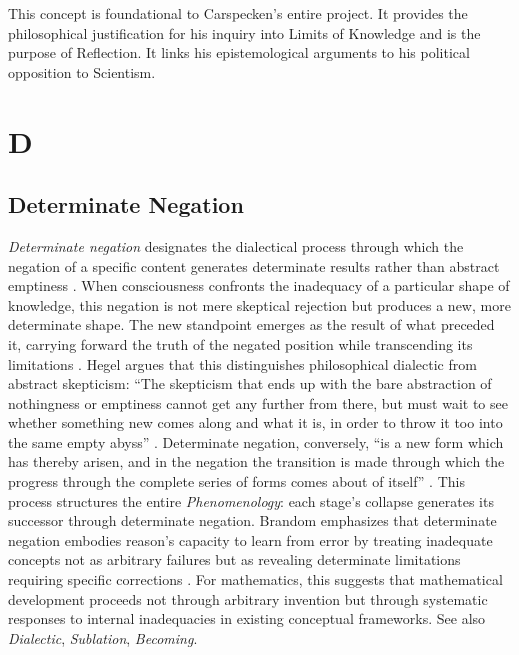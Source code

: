 \documentclass{book}
\begin{document}
This concept is foundational to Carspecken's entire project. It provides the philosophical justification for his inquiry into Limits of Knowledge and is the purpose of Reflection. It links his epistemological arguments to his political opposition to Scientism.

\parencite{carspecken_limits_2016}

\chapter{D}

\section{Determinate Negation}

\textit{Determinate negation} designates the dialectical process through which the negation of a specific content generates determinate results rather than abstract emptiness \parencite{hegel1977phenomenology}. When consciousness confronts the inadequacy of a particular shape of knowledge, this negation is not mere skeptical rejection but produces a new, more determinate shape. The new standpoint emerges as the result of what preceded it, carrying forward the truth of the negated position while transcending its limitations \parencite{hegel1977phenomenology}. Hegel argues that this distinguishes philosophical dialectic from abstract skepticism: ``The skepticism that ends up with the bare abstraction of nothingness or emptiness cannot get any further from there, but must wait to see whether something new comes along and what it is, in order to throw it too into the same empty abyss'' \parencite[\S 79]{hegel1977phenomenology}. Determinate negation, conversely, ``is a new form which has thereby arisen, and in the negation the transition is made through which the progress through the complete series of forms comes about of itself'' \parencite[\S 79]{hegel1977phenomenology}. This process structures the entire \textit{Phenomenology}: each stage's collapse generates its successor through determinate negation. Brandom emphasizes that determinate negation embodies reason's capacity to learn from error by treating inadequate concepts not as arbitrary failures but as revealing determinate limitations requiring specific corrections \parencite{Brandom:2019aa}. For mathematics, this suggests that mathematical development proceeds not through arbitrary invention but through systematic responses to internal inadequacies in existing conceptual frameworks. See also \textit{Dialectic}, \textit{Sublation}, \textit{Becoming}.
\end{document}
